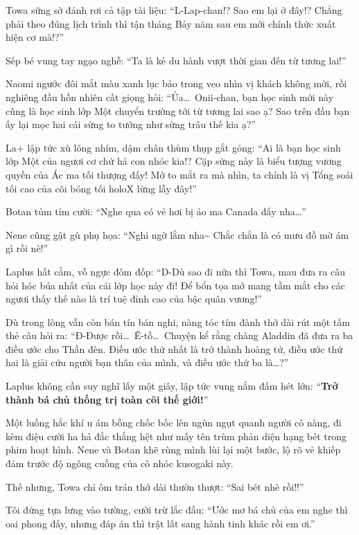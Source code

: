 \documentclass[../main.tex]{subfiles}
\begin{document}
Towa sững sờ đánh rơi cả tập tài liệu: ``L-Lap-chan!? Sao em lại ở đây!? Chẳng phải theo đúng lịch trình thì tận tháng Bảy năm sau em mới chính thức xuất hiện cơ mà!?''

Sếp bé vung tay ngạo nghễ: ``Ta là kẻ du hành vượt thời gian đến từ tương lai!''

Naomi ngước đôi mắt màu xanh lục bảo trong veo nhìn vị khách không mời, rồi nghiêng đầu hồn nhiên cất giọng hỏi: ``Ủa\dots\ Onii-chan, bạn học sinh mới này cũng là học sinh lớp Một chuyển trường tới từ tương lai sao ạ? Sao trên đầu bạn ấy lại mọc hai cái sừng to tướng như sừng trâu thế kia ạ?''

La+ lập tức xù lông nhím, dậm chân thùm thụp gắt gỏng: ``Ai là bạn học sinh lớp Một của ngươi cơ chứ hả con nhóc kia!? Cặp sừng này là biểu tượng vương quyền của Ác ma tối thượng đấy! Mở to mắt ra mà nhìn, ta chính là vị Tổng soái tối cao của cõi bóng tối holoX lừng lẫy đây!''

Botan tủm tỉm cười: ``Nghe qua có vẻ hơi bị ảo ma Canada đấy nha\dots''

Nene cũng gật gù phụ họa: ``Nghi ngờ lắm nha\~{} Chắc chắn là có mưu đồ mờ ám gì rồi nè!''

Laplus hất cằm, vỗ ngực đôm đốp: ``D-Dù sao đi nữa thì Towa, mau đưa ra câu hỏi hóc búa nhất của cái lớp học này đi! Để bổn tọa mở mang tầm mắt cho các ngươi thấy thế nào là trí tuệ đỉnh cao của bậc quân vương!''

Dù trong lòng vẫn còn bán tín bán nghi, nàng tóc tím đành thở dài rút một tấm thẻ câu hỏi ra: ``Đ-Được rồi\dots\ Ê-tồ\dots\ Chuyện kể rằng chàng Aladdin đã đưa ra ba điều ước cho Thần đèn. Điều ước thứ nhất là trở thành hoàng tử, điều ước thứ hai là giải cứu người bạn thân của mình, và điều ước thứ ba là\dots?''

Laplus không cần suy nghĩ lấy một giây, lập tức vung nắm đấm hét lớn: ``\textbf{Trở thành bá chủ thống trị toàn cõi thế giới!}''

Một luồng hắc khí u ám bỗng chốc bốc lên ngùn ngụt quanh người cô nàng, đi kèm điệu cười ha hả đắc thắng hệt như mấy tên trùm phản diện hạng bét trong phim hoạt hình. Nene và Botan khẽ rùng mình lùi lại một bước, lộ rõ vẻ khiếp đảm trước độ ngông cuồng của cô nhóc kusogaki này.

Thế nhưng, Towa chỉ ôm trán thở dài thườn thượt: ``Sai bét nhè rồi!!''

Tôi đứng tựa lưng vào tường, cười trừ lắc đầu: ``Ước mơ bá chủ của em nghe thì oai phong đấy, nhưng đáp án thì trật lất sang hành tinh khác rồi em ơi.''
\end{document}
